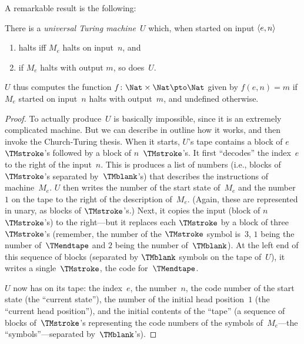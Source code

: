 \documentclass[../../../include/open-logic-section]{subfiles}
\begin{document}
A remarkable result is the following:

\begin{thm} There is a \emph{universal
  Turing machine}~$U$ which, when started on input $\langle e,n \rangle$ 
  \begin{enumerate}
    \item halts iff $M_e$ halts on input~$n$, and
    \item if $M_e$ halts with output $m$, so does~$U$.
  \end{enumerate}
  $U$ thus computes the function $f\colon \Nat \times \Nat \pto \Nat$
  given by $f(e,n) = m$ if $M_e$ started on input~$n$ halts with
  output~$m$, and undefined otherwise.
\end{thm}

\begin{proof}
  To actually produce~$U$ is basically impossible, since it is an
  extremely complicated machine. But we can describe in outline how it
  works, and then invoke the Church-Turing thesis.  When it starts,
  $U$'s tape contains a block of $e$ $\TMstroke$'s followed by a block
  of $n$~$\TMstroke$'s. It first ``decodes'' the index~$e$ to the
  right of the input~$n$. This is produces a list of numbers (i.e.,
  blocks of $\TMstroke$'s separated by~$\TMblank$'s) that describes
  the instructions of machine~$M_e$. $U$ then writes the number of the
  start state of~$M_e$ and the number~$1$ on the tape to the right of
  the description of~$M_e$. (Again, these are represented in unary, as
  blocks of $\TMstroke$'s.) Next, it copies the input (block of
  $n$~$\TMstroke$'s) to the right---but it replaces each $\TMstroke$
  by a block of three $\TMstroke$'s (remember, the number of the $\TMstroke$
  symbol is~$3$, $1$ being the number of~$\TMendtape$ and $2$ being
  the number of~$\TMblank$). At the left end of this sequence of blocks
  (separated by $\TMblank$ symbols on the tape of~$U$), it writes a
  single~$\TMstroke$, the code for~$\TMendtape$.

  $U$ now has on its tape: the index~$e$, the number~$n$, the code
  number of the start state (the ``current state''), the number of the
  initial head position~$1$ (the ``current head position''), and the
  initial contents of the ``tape'' (a sequence of blocks
  of~$\TMstroke$'s representing the code numbers of the symbols
  of~$M_e$---the ``symbols''---separated by~$\TMblank$'s).


\end{proof}
\end{document}
